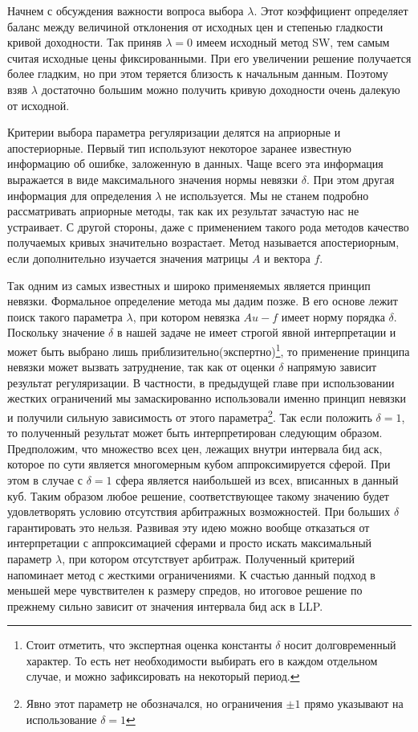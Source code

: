 \documentclass[10pt]{article}
\theoremstyle{definition}
\theoremstyle{remark}
\theoremstyle{plain}
\begin{document}
Начнем с обсуждения важности вопроса выбора $\lambda$. Этот коэффициент определяет баланс между величиной отклонения от исходных цен и степенью гладкости кривой доходности. Так приняв $\lambda = 0$  имеем исходный метод SW, тем самым считая исходные цены фиксированными. При его увеличении решение получается более гладким, но при этом теряется близость к начальным данным. Поэтому взяв $\lambda$ достаточно большим можно получить кривую доходности очень далекую от исходной. 

Критерии выбора параметра регуляризации делятся на априорные и апостериорные. Первый тип используют некоторое заранее известную информацию об ошибке, заложенную в данных. Чаще всего эта информация выражается в виде максимального значения нормы невязки $\delta$. При этом другая информация для определения $\lambda$ не используется. Мы не станем подробно рассматривать априорные методы, так как их результат зачастую нас не устраивает. С другой стороны, даже с применением такого рода методов качество получаемых кривых значительно возрастает. Метод называется апостериорным, если дополнительно изучается значения матрицы $A$ и вектора $f$. 

Так одним из самых известных и широко применяемых является принцип невязки. Формальное определение метода мы дадим позже. В его основе лежит поиск такого параметра $\lambda$, при котором невязка $Au-f$ имеет норму порядка $\delta$. Поскольку значение $\delta$ в нашей задаче не имеет строгой явной интерпретации и может быть выбрано лишь приблизительно(экспертно)\footnote{Стоит отметить, что экспертная оценка константы $\delta$ носит долговременный характер. То есть нет необходимости выбирать его в каждом отдельном случае, и можно зафиксировать на некоторый период.}, то применение принципа невязки может вызвать затруднение, так как от оценки $\delta$ напрямую зависит результат регуляризации. В частности, в предыдущей главе при использовании жестких ограничений мы замаскированно использовали именно принцип невязки и получили сильную зависимость от этого параметра\footnote{Явно этот параметр не обозначался, но ограничения $\pm 1$ прямо указывают на использование $\delta = 1$}. Так если положить $\delta = 1$, то полученный результат может быть интерпретирован следующим образом. Предположим, что множество всех цен, лежащих внутри интервала бид аск, которое по сути является многомерным кубом аппроксимируется сферой. При этом в случае с $\delta = 1$ сфера является наибольшей из всех, вписанных в данный куб. Таким образом любое решение, соответствующее такому значению будет удовлетворять условию отсутствия арбитражных возможностей. При больших $\delta$ гарантировать это нельзя. Развивая эту идею можно вообще отказаться от интерпретации с аппроксимацией сферами и просто искать максимальный параметр $\lambda$, при котором отсутствует арбитраж. Полученный критерий напоминает метод с жесткими ограничениями. К счастью данный подход в меньшей мере чувствителен к размеру спредов, но итоговое решение по прежнему сильно зависит от значения интервала бид аск в LLP. 
\end{document}

